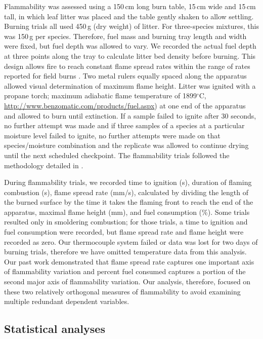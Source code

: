 \documentclass[letterpaper,12pt]{article}
\begin{document}
Flammability was assessed using a 150\,cm long burn table, 15\,cm wide and
15\,cm tall, in which leaf litter was placed and the table gently shaken to
allow settling. Burning trials all used 450\,g (dry weight) of litter. For
three-species mixtures, this was 150\,g per species. Therefore, fuel mass and
burning tray length and width were fixed, but fuel depth was allowed to vary.
We recorded the actual fuel depth at three points along the tray to calculate
litter bed density before burning. This design allows fire to reach constant
flame spread rates within the range of rates reported for field burns
\citep{Magalhaes+Schwilk-2012}. Two metal rulers equally spaced along the
apparatus allowed visual determination of maximum flame height. Litter was
ignited with a propane torch; maximum adiabatic flame temperature of
1899$^\circ$C, \url{http://www.benzomatic.com/products/fuel.aspx}) at one end
of the apparatus and allowed to burn until extinction. If a sample failed to
ignite after 30 seconds, no further attempt was made and if three samples of a
species at a particular moisture level failed to ignite, no further attempts
were made on that species/moisture combination and the replicate was allowed to
continue drying until the next scheduled checkpoint. The flammability trials
followed the methodology detailed in \citet{Magalhaes+Schwilk-2012}.
 
During flammability trials, we recorded time to ignition (s), duration of
flaming combustion (s), flame spread rate (mm/s), calculated by dividing the
length of the burned surface by the time it takes the flaming front to reach
the end of the apparatus, maximal flame height (mm), and fuel consumption (\%).
Some trials resulted only in smoldering combustion; for those trials, a time to
ignition and fuel consumption were recorded, but flame spread rate and flame
height were recorded as zero. Our thermocouple system failed or data was lost
for two days of burning trials, therefore we have omitted temperature data from
this analysis. Our past work \citep{Magalhaes+Schwilk-2012} demonstrated that
flame spread rate captures one important axis of flammability variation
\citep{Schwilk-2015, Pausas+Keeley+etal-2017, Prior+Murphy+etal-2018} and
percent fuel consumed captures a portion of the second major axis of
flammability variation. Our analysis, therefore, focused on these two
relatively orthogonal measures of flammability to avoid examining multiple
redundant dependent variables.


\subsection*{Statistical analyses}
\end{document}
